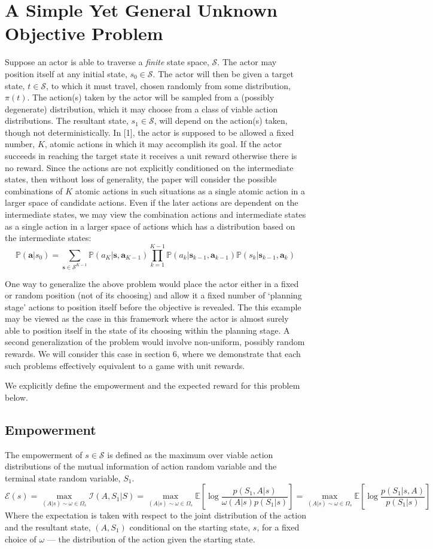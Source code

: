 \documentclass{article}
\newcommand{\EE}{\mathbb{E}}
\newcommand{\PP}{\mathbb{P}}
\newcommand{\Ss}{\mathcal{S}}
\newcommand{\Ii}{\mathcal{I}}
\newcommand{\Ee}{\mathcal{E}}
\begin{document}
\section{A Simple Yet General Unknown Objective Problem}
Suppose an actor is able to traverse a \textit{finite} state space, $\Ss$. 
The actor may position itself at any initial state, $s_0\in \Ss$. 
The actor will then be given a target state, $t\in \Ss$, to which it must travel, chosen randomly from some distribution, $\pi(t)$. 
The action(s) taken by the actor will be sampled from a (possibly degenerate) distribution, which it may choose from a class of viable action distributions. 
The resultant state, $s_1\in\Ss$, will depend on the action(s) taken, though not deterministically.  
In [1], the actor is supposed to be allowed a fixed number, $K$, atomic actions in which it may accomplish its goal. If the actor succeeds in reaching the target state it receives a unit reward otherwise there is no reward. Since the actions are not explicitly conditioned on the intermediate states, then without loss of generality, the paper will consider the possible combinations of $K$ atomic actions in such situations as a single atomic action in a larger space of candidate actions. Even if the later actions are dependent on the intermediate states, we may view the combination actions and intermediate states as a single action in a larger space of actions which has a distribution based on the intermediate states:
\[\PP(\mathbf{a}|s_0) = \sum_{\mathbf{s}\in \Ss^{K-1}} \PP(a_K|\mathbf{s},\mathbf{a}_{K-1}) \prod_{k=1}^{K-1} \PP(a_k|\mathbf{s}_{k-1},\mathbf{a}_{k-1})\PP(s_{k}|\mathbf{s}_{k-1},\mathbf{a}_k)\]

One way to generalize the above problem would place the actor either in a fixed or random position (not of its choosing) and allow it a fixed number of `planning stage' actions to position itself before the objective is revealed. 
The this example may be viewed as the case in this framework where the actor is almost surely able to position itself in the state of its choosing within the planning stage. A second generalization of the problem would involve non-uniform, possibly random rewards. We will consider this case in section 6, where we demonstrate that each such problems effectively equivalent to a game with unit rewards. 

We explicitly define the empowerment and the expected reward for this problem below.

\subsection{Empowerment}
The empowerment of $s\in\mathcal{S}$ is defined as the maximum over viable action distributions of the mutual information of action random variable and the terminal state random variable, $S_1$.
\[\Ee(s)=\max_{(A|s)\sim\omega\in\Omega_s}\Ii(A,S_1|S)=\max_{(A|s)\sim\omega\in\Omega_s}\EE\left[\log\frac{p(S_1,A|s)}{\omega(A|s)p(S_1|s)}\right]=\max_{(A|s)\sim\omega\in\Omega_s}\EE\left[\log\frac{p(S_1|s,A)}{p(S_1|s)}\right] \]
Where the expectation is taken with respect to the joint distribution of the action and the resultant state, $(A,S_1)$ conditional on the starting state, $s$, for a fixed choice of $\omega$ --- the distribution of the action given the starting state. 
\end{document}
